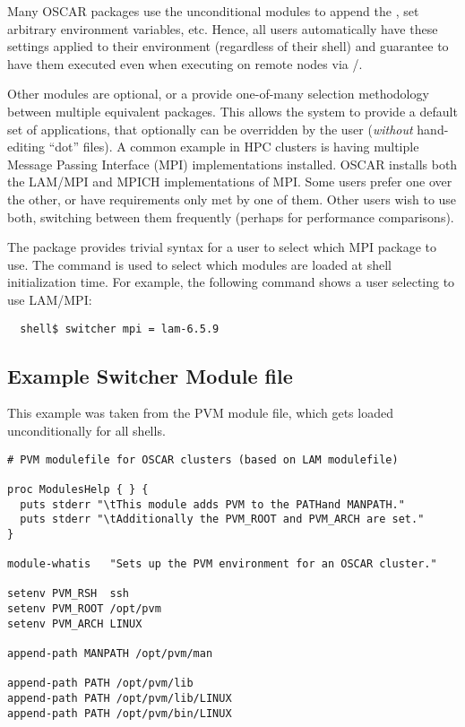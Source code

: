 Many OSCAR packages use the unconditional modules to append the
, set arbitrary environment variables, etc.  Hence, all
users automatically have these settings applied to their environment
(regardless of their shell) and guarantee to have them executed even
when executing on remote nodes via /.

Other modules are optional, or a provide one-of-many selection
methodology between multiple equivalent packages.  This allows the
system to provide a default set of applications, that optionally can
be overridden by the user ({\em without} hand-editing ``dot'' files).
%
A common example in HPC clusters is having multiple Message Passing
Interface (MPI)
implementations installed.  OSCAR installs both the
LAM/MPI and MPICH
implementations of MPI.  Some users prefer one over the other, or have
requirements only met by one of them.  Other users wish to use both,
switching between them frequently (perhaps for performance
comparisons).

The  package provides trivial syntax for a user
to select which MPI package to use.  The  command is
used to select which modules are loaded at shell initialization time.
For example, the following command shows a user selecting to use
LAM/MPI:
%
\begin{verbatim}
  shell$ switcher mpi = lam-6.5.9
\end{verbatim}

\subsection{Example Switcher Module file}

This example was taken from the PVM module file, which gets loaded
unconditionally for all shells.

\begin{footnotesize}
\begin{verbatim}
# PVM modulefile for OSCAR clusters (based on LAM modulefile)

proc ModulesHelp { } {
  puts stderr "\tThis module adds PVM to the PATHand MANPATH."
  puts stderr "\tAdditionally the PVM_ROOT and PVM_ARCH are set."
}

module-whatis   "Sets up the PVM environment for an OSCAR cluster."

setenv PVM_RSH  ssh
setenv PVM_ROOT /opt/pvm
setenv PVM_ARCH LINUX

append-path MANPATH /opt/pvm/man

append-path PATH /opt/pvm/lib
append-path PATH /opt/pvm/lib/LINUX
append-path PATH /opt/pvm/bin/LINUX
\end{verbatim}
\end{footnotesize}

